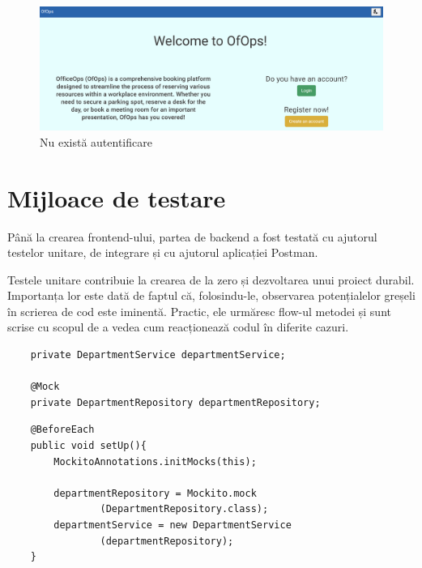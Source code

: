 \begin{figure}[!htb]
    \centering
    \includegraphics[width=0.9\linewidth]{images/pagina-nelogat.png}
    \caption{Nu există autentificare}
    \label{fig:pagina-nelogat}
\end{figure}

\section{Mijloace de testare}
Până la crearea frontend-ului, partea de backend a fost testată cu ajutorul testelor unitare, de integrare și cu ajutorul aplicației Postman.

Testele unitare contribuie la crearea de la zero și dezvoltarea unui proiect durabil.\cite{citation7} Importanța lor este dată de faptul că, folosindu-le, observarea potențialelor greșeli în scrierea de cod este iminentă. Practic, ele urmăresc flow-ul metodei și sunt scrise cu scopul de a vedea cum reacționează codul în diferite cazuri.

\begin{center}
\begin{minipage}{0.9\textwidth}
\captionsetup{type=listing}
   \begin{lstlisting}
    private DepartmentService departmentService;

    @Mock
    private DepartmentRepository departmentRepository;

        \end{lstlisting} 
\end{minipage}
\end{center}

\begin{center}
\begin{minipage}{0.9\textwidth}
\captionsetup{type=listing}
   \begin{lstlisting}
    @BeforeEach
    public void setUp(){
        MockitoAnnotations.initMocks(this);

        departmentRepository = Mockito.mock
                (DepartmentRepository.class);
        departmentService = new DepartmentService
                (departmentRepository);
    }
    \end{lstlisting} 
\end{minipage}
\end{center}

